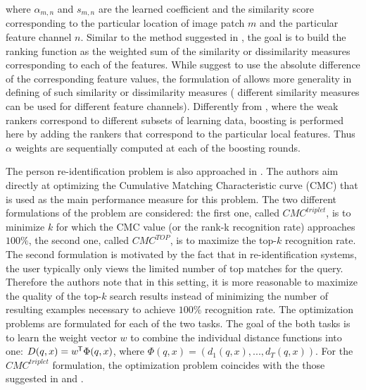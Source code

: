where $\alpha_{m,n}$ and $s_{m,n}$ are the learned coefficient and the similarity score corresponding to the particular location of image patch $m$ and the particular feature channel $n$. Similar to the method suggested in \citep{prosser2010person}, the goal is to build the ranking function as the weighted sum of the similarity or dissimilarity measures corresponding to each of the features. While \citep{prosser2010person} suggest to use the absolute difference of the corresponding feature values, the formulation of \citep{kuo2013person} allows more generality in defining of such similarity or dissimilarity measures (\eg{} different similarity measures can be used for different feature channels).
Differently from \citep{prosser2010person}, where the weak rankers correspond to different subsets of learning data, boosting is performed here by adding the rankers that correspond to the particular local features. Thus $\alpha$ weights are sequentially computed at each of the boosting rounds.

The person re-identification problem is also approached in \citep{paisitkriangkrai2015learning}. The authors aim directly at optimizing the Cumulative Matching Characteristic curve (CMC) that is used as the main performance measure for this problem. The two different formulations of the problem are considered: the first one, called $CMC^{triplet}$, is to minimize $k$ for which the CMC value (or the rank-k recognition rate) approaches $100\%$, the second one, called $CMC^{TOP}$, is to maximize the top-$k$ recognition rate. The second formulation is motivated by the fact that in re-identification systems, the user typically only views the limited number of top matches for the query. Therefore the authors note that in this setting, it is more reasonable to maximize the quality of the top-$k$ search results instead of minimizing the number of resulting examples necessary to achieve $100\%$ recognition rate. The optimization problems are formulated for each of the two tasks.
The goal of the both tasks is to learn the weight vector $w$ to combine the individual distance functions into one: $D(q,x) = w^{\mkern-1.5mu\mathsf{T}} \Phi(q, x)$, where  $\Phi(q, x) = (d_1(q, x), ..., d_T(q, x))$. 
For the $CMC^{triplet}$ formulation, the optimization problem coincides with the those suggested in \citep{joachims2002optimizing} and \citep{prosser2010person}. 

